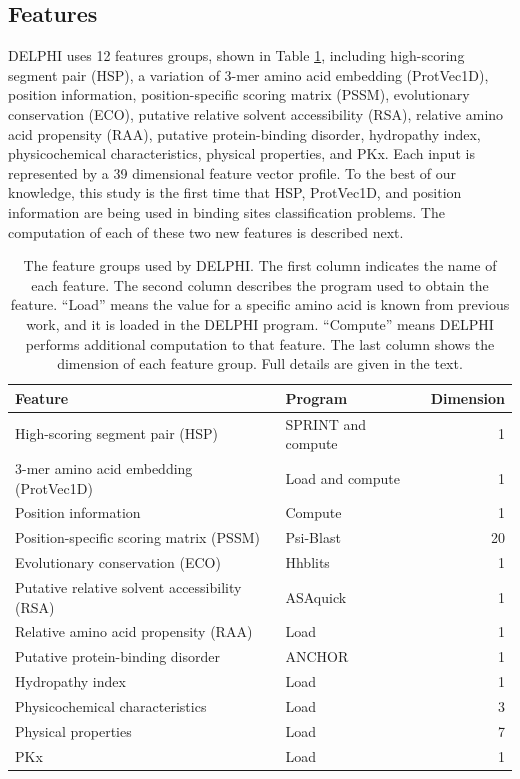 \subsection{Features}
DELPHI uses 12 features groups, shown in Table \ref{tab_feture}, including high-scoring segment pair (HSP), a variation of 3-mer amino acid embedding (ProtVec1D), position information, position-specific scoring matrix (PSSM), evolutionary conservation (ECO), putative relative solvent accessibility (RSA), relative amino acid propensity (RAA), putative protein-binding disorder, hydropathy index, physicochemical characteristics, physical properties, and PKx. Each input is represented by a 39 dimensional feature vector profile. To the best of our knowledge, this study is the first time that HSP, ProtVec1D, and position information are being used in binding sites classification problems. The computation of each of these two new features is described next.

\begin{table}[htbp]
  \centering
  \caption[The feature groups used by DELPHI]{The feature groups used by DELPHI. The first column indicates the name of each feature. The second column describes the program used to obtain the feature. ``Load'' means the value for a specific amino acid is known from previous work, and it is loaded in the DELPHI program. ``Compute'' means DELPHI performs additional computation to that feature. The last column shows the dimension of each feature group. Full details are given in the text.}
    \begin{tabular}{p{20.93em}p{11em}r}
    \toprule
    Feature & Program & \multicolumn{1}{p{5.145em}}{Dimension} \\
    \midrule
    High-scoring segment pair (HSP) & SPRINT and compute & 1 \\
    3-mer amino acid embedding (ProtVec1D) & Load and compute & 1 \\
    Position information & Compute & 1 \\
    Position-specific scoring matrix (PSSM) & Psi-Blast & 20 \\
    Evolutionary conservation (ECO) & Hhblits & 1 \\
    Putative relative solvent accessibility (RSA) & ASAquick & 1 \\
    Relative amino acid propensity (RAA) & Load  & 1 \\
    Putative protein-binding disorder & ANCHOR & 1 \\
    Hydropathy index & Load  & 1 \\
    Physicochemical characteristics & Load  & 3 \\
    Physical properties & Load  & 7 \\
    PKx   & Load  & 1 \\
    \bottomrule
    \end{tabular}%
  \label{tab_feture}%
\end{table}%

